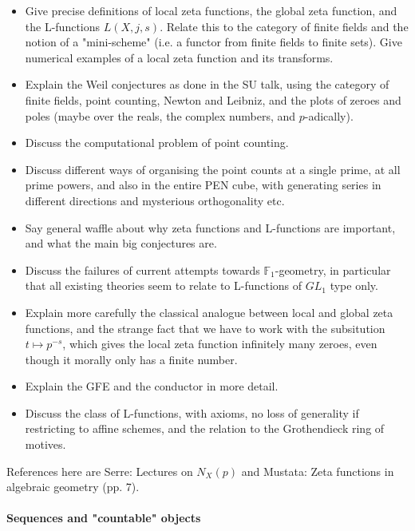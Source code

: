 \documentclass[paper=a4, fontsize=11pt]{scrartcl} %
\numberwithin{equation}{section} %
\numberwithin{figure}{section} %
\numberwithin{table}{section} %
\begin{document}
\begin{itemize}
\item Give precise definitions of local zeta functions, the global zeta function, and the L-functions $L(X, j, s)$. Relate this to the category of finite fields and the notion of a "mini-scheme" (i.e. a functor from finite fields to finite sets). Give numerical examples of a local zeta function and its transforms.
\item Explain the Weil conjectures as done in the SU talk, using the category of finite fields, point counting, Newton and Leibniz, and the plots of zeroes and poles (maybe over the reals, the complex numbers, and $p$-adically).
\item Discuss the computational problem of point counting.
\item Discuss different ways of organising the point counts at a single prime, at all prime powers, and also in the entire PEN cube, with generating series in different directions and mysterious orthogonality etc.
\item Say general waffle about why zeta functions and L-functions are important, and what the main big conjectures are.
\item Discuss the failures of current attempts towards $\mathbb{F}_1$-geometry, in particular that all existing theories seem to relate to L-functions of $GL_1$ type only.
\item Explain more carefully the classical analogue between local and global zeta functions, and the strange fact that we have to work with the subsitution $t \mapsto p^{-s}$, which gives the local zeta function infinitely many zeroes, even though it morally only has a finite number.
\item Explain the GFE and the conductor in more detail.
\item Discuss the class of L-functions, with axioms, no loss of generality if restricting to affine schemes, and the relation to the Grothendieck ring of motives.
\end{itemize}

References here are Serre: Lectures on $N_X(p)$ and Mustata: Zeta functions in algebraic geometry (pp. 7).

\paragraph{Sequences and "countable" objects}
\end{document}
